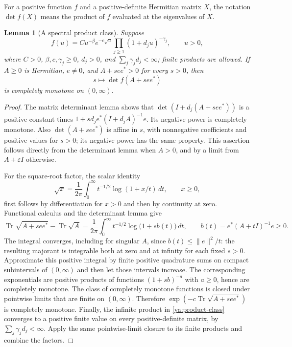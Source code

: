 \documentclass[11pt,a4paper]{article}
\newtheorem{lemma}[theorem]{Lemma}
\theoremstyle{definition}
\theoremstyle{remark}
\numberwithin{equation}{section}
\begin{document}
For a positive function $f$ and a positive-definite Hermitian matrix
$X$, the notation $\det f(X)$ means the product of $f$ evaluated at the
eigenvalues of $X$.

\begin{lemma}[A spectral product class]\label{ya:spectral-class}
Suppose
\begin{equation}\label{ya:product-class}
 f(u)=C u^{-\beta}e^{-c\sqrt u}
       \prod_{j\ge1}(1+d_ju)^{-\gamma_j},\qquad u>0,
\end{equation}
where $C>0$, $\beta,c,\gamma_j\ge0$, $d_j>0$, and
$\sum_j\gamma_jd_j<\infty$; finite products are allowed.
If $A\ge0$ is Hermitian, $e\ne0$, and $A+see^*>0$ for every $s>0$,
then
\[
 s\longmapsto\det f(A+see^*)
\]
is completely monotone on $(0,\infty)$.
\end{lemma}
\begin{proof}
The matrix determinant lemma shows that
$\det(I+d_j(A+see^*))$ is a positive constant times
$1+s d_je^*(I+d_jA)^{-1}e$. Its negative power is completely
monotone. Also $\det(A+see^*)$ is affine in $s$, with nonnegative
coefficients and positive values for $s>0$; its negative power has the
same property. This assertion follows directly from the determinant
lemma when $A>0$, and by a limit from $A+\varepsilon I$ otherwise.

For the square-root factor, the scalar identity
\[
 \sqrt{x}=\frac1{2\pi}\int_0^\infty
                t^{-1/2}\log(1+x/t)\,dt,\qquad x\ge0,
\]
first follows by differentiation for $x>0$ and then by continuity at
zero. Functional calculus and the determinant lemma give
\begin{equation}\label{ya:root-log}
 \operatorname{Tr}\sqrt{A+see^*}-\operatorname{Tr}\sqrt A
 =\frac1{2\pi}\int_0^\infty
        t^{-1/2}\log\bigl(1+s b(t)\bigr)\,dt,
 \qquad b(t)=e^*(A+tI)^{-1}e\ge0.
\end{equation}
The integral converges, including for singular $A$, since
$b(t)\le\|e\|^2/t$: the resulting majorant is integrable both at zero
and at infinity for each fixed $s>0$.
Approximate this positive integral by finite positive quadrature sums
on compact subintervals of $(0,\infty)$ and then let those intervals
increase. The corresponding exponentials are positive products of
functions $(1+s b)^{-a}$ with $a\ge0$, hence are completely monotone.
The class of completely monotone functions is closed under
pointwise limits that are finite on $(0,\infty)$. Therefore
$\exp(-c\operatorname{Tr}\sqrt{A+see^*})$ is completely monotone.
Finally, the infinite product in \eqref{ya:product-class} converges to
a positive finite value on every positive-definite matrix, by
$\sum_j\gamma_jd_j<\infty$. Apply the same pointwise-limit closure to
its finite products and combine the factors.
\end{proof}
\end{document}
